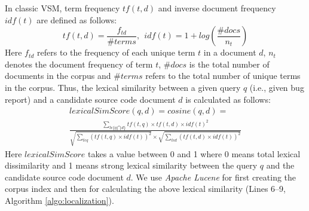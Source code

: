 \documentclass[sigconf,review,anonymous]{acmart}
\begin{document}
In classic VSM, term frequency $tf(t,d)$ and inverse document frequency $idf (t)$ are defined as follows:
\begin{equation*}
tf(t,d)=\frac{f_{td}}{\#terms},~~idf(t)=1+log(\frac{\#docs}{n_{t}})
\end{equation*}
Here $f_{td}$ refers to the frequency of each unique term {$t$} in a document {$d$}, $n_t$ denotes the document frequency of term $t$, $\#docs$ is the total number of documents in the corpus and $\#terms$ refers to the total number of unique terms in the corpus.  
Thus, the lexical similarity between a given query $q$ (i.e., given bug report) and a candidate source code document $d$ is calculated as follows:
\begin{multline*}\label{VSMequation}
lexicalSimScore(q,d)= cosine(q,d) =
\\
\frac{\sum_{t\epsilon \{q\bigcap d\}}tf(t,q)\times tf(t,d)\times idf(t)^{2}
}{\sqrt{\sum_{t\epsilon q}(tf(t,q)\times idf(t))^2}\times
	\sqrt{\sum_{t\epsilon d}(tf(t,d)\times idf(t))^2}}
\end{multline*}
Here $lexicalSimScore$ takes a value between 0 and 1 where 0 means total lexical dissimilarity and 1 means strong lexical similarity between the query $q$ and the candidate source code document $d$. We use \emph{Apache Lucene} for first creating the corpus index and then for calculating the above lexical similarity (Lines 6--9, Algorithm \ref{algo:localization}).
\end{document}
